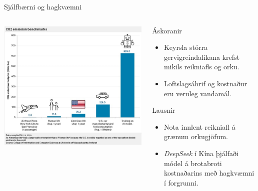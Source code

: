 \documentclass[
    NAME={Dr. Helga Ingimundardóttir},
    EMAIL={helgaingim@hi.is},
    FACULTY={Iðnaðarverkfræðideild},
    TITLE={Spáum fyrir um framtíð gervigreindar},
    SUBTITLE={út frá akademísku sjónarmiði},
    SEMINAR={Stjórnvísi},
    DATE={22. febrúar 2025},
    WIDE=true,
    ICELANDIC=true
]{HI-LaTeX/hi-beamer}
\begin{document}
\begin{frame}{Sjálfbærni og hagkvæmni}
\begin{columns}
    \begin{column}{.4\linewidth}
        \centering
        \includegraphics[width=\linewidth]{myndir/co2-emission.jpg}
    \end{column}
    \begin{column}{0.58\linewidth}
    \begin{block}{Áskoranir}
        \begin{itemize}
            \item Keyrsla stórra gervigreindalíkana krefst mikils reikniafls og orku.
            \item Loftslagsáhrif og kostnaður eru veruleg vandamál.
        \end{itemize}
    \end{block}
    \begin{block}{Lausnir}
        \begin{itemize}
            \item Nota innlent reikniafl á grænum orkugjöfum.
            \item \emph{DeepSeek} í Kína þjálfaði módel á brotabroti kostnaðarins með hagkvæmni í forgrunni.
        \end{itemize}
    \end{block}
   \end{column}
\end{columns}
\end{frame}
\end{document}
